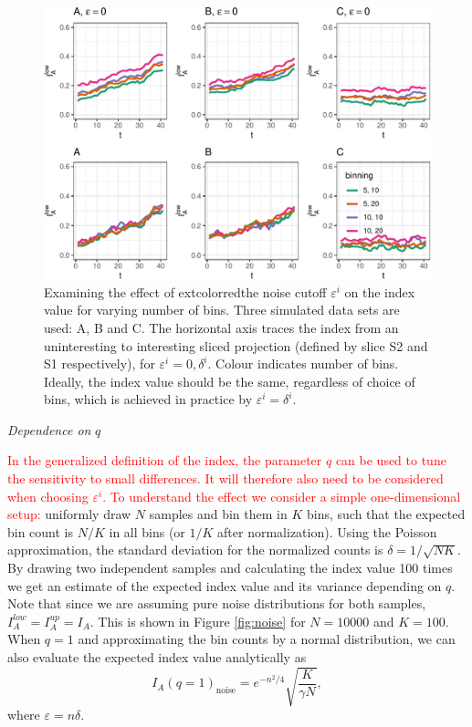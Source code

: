 \documentclass[]{interact}
\theoremstyle{plain}%
\theoremstyle{definition}
\theoremstyle{remark}
\begin{document}
\begin{figure}

{\centering \includegraphics[width=0.9\linewidth]{section_pursuit_files/figure-latex/path_eps-1} 

}

\caption{Examining the effect of    extcolor{red}{the noise cutoff} $\varepsilon^i$ on the index value for varying number of bins. Three simulated data sets are used:  A, B and C. The horizontal axis traces the index from an uninteresting to interesting sliced projection (defined by slice S2 and S1 respectively), for $\varepsilon^i=0, \delta^i$. Colour indicates number of bins. Ideally, the index value should be the same, regardless of choice of bins, which is achieved in practice by $\varepsilon^i=\delta^i$.}\label{fig:path_eps}
\end{figure}

\emph{Dependence on} \(q\)

\textcolor{red}{In the generalized definition of the index, the parameter $q$ can be used to tune the sensitivity to small differences. It will therefore also need to be considered when choosing $\varepsilon^i$. To understand the effect we consider a simple one-dimensional setup:}
uniformly draw \(N\) samples and bin them in \(K\) bins, such that the
expected bin count is \(N/K\) in all bins (or \(1/K\) after
normalization). Using the Poisson approximation, the standard deviation
for the normalized counts is \(\delta=1/\sqrt{N K}\). By drawing two
independent samples and calculating the index value 100 times we get an
estimate of the expected index value and its variance depending on
\(q\). Note that since we are assuming pure noise distributions for both
samples, \(I_A^{low}=I_A^{up}=I_A\). This is shown in Figure
\ref{fig:noise} for \(N=10000\) and \(K=100\). When \(q=1\) and
approximating the bin counts by a normal distribution, we can also
evaluate the expected index value analytically as \begin{equation}
I_A(q=1)_{\mathrm{noise}} = e^{-n^2/4} \sqrt{\frac{K}{\gamma N}},
\end{equation} where \(\varepsilon=n\delta\).
\end{document}
